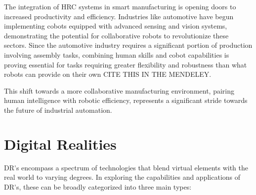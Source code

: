 The integration of \ac{HRC} systems in smart manufacturing is opening doors to increased productivity and efficiency. Industries like automotive 
have begun implementing cobots equipped with advanced sensing and vision systems, demonstrating the potential for collaborative robots to 
revolutionize these sectors. Since the automotive industry requires a significant portion of production involving assembly tasks, combining 
human skills and cobot capabilities is proving essential for tasks requiring greater flexibility and robustness than what robots can provide 
on their own \cite{Tsarouchi2016} CITE THIS IN THE MENDELEY. 

This shift towards a more collaborative manufacturing environment, pairing human intelligence with robotic efficiency, represents a significant 
stride towards the future of industrial automation.

\section{Digital Realities} 


\ac{DR's} encompass a spectrum of technologies that blend virtual elements with the real world to varying degrees. 
In exploring the capabilities and applications of \ac{DR's}, these can be broadly categorized into three main types:

